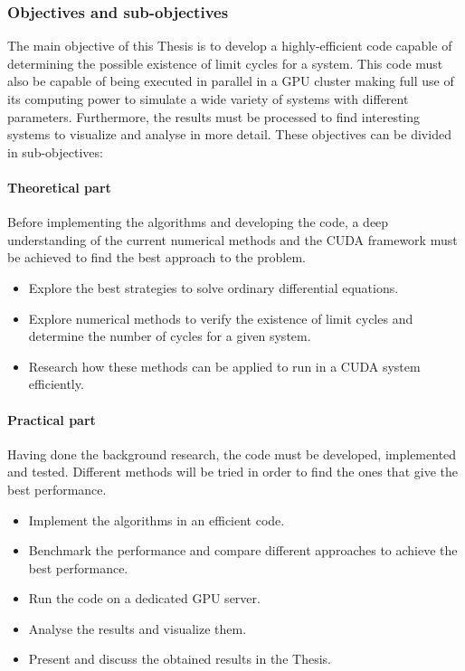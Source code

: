 \subsubsection{Objectives and sub-objectives}

The main objective of this Thesis is to develop a highly-efficient code capable of determining the possible existence of limit cycles for a system. This code must also be capable of being executed in parallel in a GPU cluster making full use of its computing power to simulate a wide variety of systems with different parameters. Furthermore, the results must be processed to find interesting systems to visualize and analyse in more detail. These objectives can be divided in sub-objectives:

\paragraph{Theoretical part}

Before implementing the algorithms and developing the code, a deep understanding
of the current numerical methods and the CUDA framework must be achieved to find
the best approach to the problem.

\begin{itemize}
    \item Explore the best strategies to solve ordinary differential equations.
    \item Explore numerical methods to verify the existence of limit cycles and determine the number of cycles for a given system.
    \item Research how these methods can be applied to run in a CUDA system efficiently.
\end{itemize}

\paragraph{Practical part}

Having done the background research, the code must be developed, implemented and
tested.  Different methods will be tried in order to find the ones that give the
best performance.

\begin{itemize}
    \item Implement the algorithms in an efficient code.
    \item Benchmark the performance and compare different approaches to achieve the best performance.
    \item Run the code on a dedicated GPU server.
    \item Analyse the results and visualize them.
    \item Present and discuss the obtained results in the Thesis.
\end{itemize}

